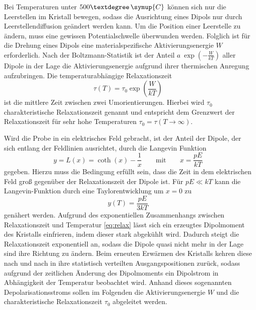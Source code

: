 Bei Temperaturen unter $500°\, \symup{C}$ können sich nur die Leerstellen im Kristall bewegen, sodass die Ausrichtung eines Dipols nur durch Leerstellendiffusion geändert werden kann.
Um die Position einer Leerstelle zu ändern, muss eine gewissen Potentialschwelle überwunden werden.
Folglich ist für die Drehung eines Dipols eine materialspezifische Aktivierungsenergie $W$ erforderlich.
Nach der Boltzmann-Statistik ist der Anteil ${a~\exp(-\frac{W}{kT})}$ aller Dipole in der Lage die Aktivierungsenergie aufgrund ihrer thermischen Anregung aufzubringen.
Die temperaturabhängige Relaxationszeit
\begin{equation}\label{eq:relax}
  \tau(T)=\tau_0\exp\left( \frac{W}{kT}\right )
\end{equation}
ist die mittlere Zeit zwischen zwei Umorientierungen.
Hierbei wird $\tau_0$ charakteristische Relaxationszeit genannt und entspricht dem Grenzwert der Relaxationszeit für sehr hohe Temperaturen $\tau_0 = \tau(T\rightarrow \infty)$.

Wird die Probe in ein elektrisches Feld gebracht, ist der Anteil der Dipole, der sich entlang der Feldlinien ausrichtet, durch die Langevin Funktion
\begin{equation}\label{eq:Langevin}
    y = L(x) = \coth(x)-\frac{1}{x} \qquad \text{mit} \qquad x=\frac{pE}{kT}
\end{equation}
gegeben.
Hierzu muss die Bedingung erfüllt sein, dass die Zeit in dem elektrischen Feld groß gegenüber der Relaxationszeit der Dipole ist.
Für $pE \ll kT$ kann die Langevin-Funktion durch eine Taylorentwicklung um $x=0$ zu 
\begin{equation}\label{eq:Langevin2}
    y(T)=\frac{pE}{3kT}
\end{equation}
genähert werden.
Aufgrund des exponentiellen Zusammenhangs zwischen Relaxationszeit und Temperatur \eqref{eq:relax} lässt sich ein erzeugtes Dipolmoment des Kristalls einfrieren, indem dieser stark abgekühlt wird.
Dadurch steigt die Relaxationszeit exponentiell an, sodass die Dipole quasi nicht mehr in der Lage sind ihre Richtung zu ändern.
Beim erneuten Erwärmen des Kristalls kehren diese nach und nach in ihre statistisch verteilten Ausgangspositionen zurück, sodass aufgrund der zeitlichen Änderung des Dipolmoments ein Dipolstrom in Abhängigkeit der Temperatur beobachtet wird.
Anhand dieses sogenannten Depolarisationsstroms sollen im Folgenden die Aktivierungsenergie $W$ und die charakteristische Relaxationszeit $\tau_0$ abgeleitet werden.

